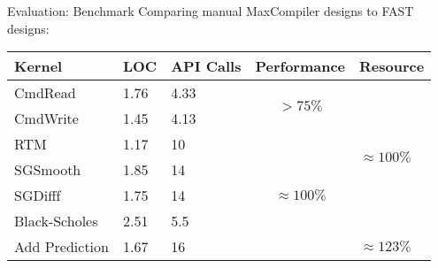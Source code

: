\begin{frame}{Evaluation: Benchmark}
  Comparing manual MaxCompiler designs to FAST designs:
  \begin{table}
    \renewcommand{\arraystretch}{1.2}
    \begin{tabular}{l|p{1cm}|p{1cm}|c|p{2cm}}
      \textbf{Kernel} & \textbf{LOC} & \textbf{API Calls} & \textbf{Performance}              & \textbf{Resource}
      \\
      \hline\hline
      CmdRead         & 1.76               & 4.33                     & \multirow{2}{*}{$ > 75\%$}        & \multirow{6}{3cm}{$\approx 100\%$} \\
      CmdWrite        & 1.45               & 4.13                     &                                   &                              \\
      \cline{1-4}
      RTM             & 1.17               & 10                       & \multirow{5}{*}{$ \approx 100\%$} &                              \\
      SGSmooth        & 1.85               & 14                       &                                   &                              \\
      SGDifff         & 1.75               & 14                       &                                   &                              \\
      Black-Scholes   & 2.51               & 5.5                      &                                   &                              \\
      \cline{5-5}
      Add Prediction  & 1.67               & 16                       &                                   &    $ \approx 123 \% $                          \\
    \end{tabular}
  \end{table}

\end{frame}